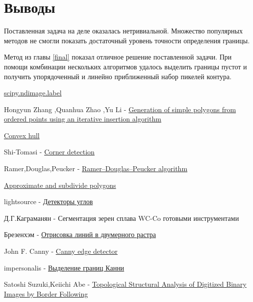 \documentclass[a4paper, 14pt]{article}
\begin{document}
\section{Выводы}

Поставленная задача на деле оказалась нетривиальной. Множество популярных методов не смогли показать достаточный уровень точности определения границы. 

Метод из главы \ref{final} показал отличное решение поставленной задачи. При помощи комбинации нескольких алгоритмов удалось выделить границы пустот и получить упорядоченный и линейно приближенный набор пикелей контура.  

\newpage
\begin{thebibliography}{}
	
	
	   \href{https://docs.scipy.org/doc/scipy/reference/generated/scipy.ndimage.label.html}{scipy.ndimage.label}
	
	  Hongyun Zhang ,Quanhua Zhao  ,Yu Li   -  \href{https://journals.plos.org/plosone/article?id=10.1371/journal.pone.0230342}{Generation of simple polygons from ordered points using an iterative insertion algorithm}
	
	    \href{https://en.wikipedia.org/wiki/Convex_hull}{Convex hull}

	  Shi-Tomasi   -  \href{https://en.wikipedia.org/wiki/Corner_detection}{Corner detection}
	
	 Ramer,Douglas,Peucker  - \href{https://habr.com/ru/post/448618/}{Ramer–Douglas–Peucker algorithm}
	
	  \href{https://scikit-image.org/docs/dev/auto_examples/edges/plot_polygon.html#sphx-glr-download-auto-examples-edges-plot-polygon-py} {Approximate and subdivide polygons}
	
	 lightsource
	 -  \href{	https://habr.com/ru/post/244541/} {Детекторы углов}
	

	
	 Д.Г.Каграманян -  Сегментация зерен сплава WC-Co готовыми инструментами
	
	   Брезенхэм   -  \href{https://en.wikipedia.org/wiki/Bresenham%27s_line_algorithm}{Отрисовка линий в двумерного растра}
		
	    John F. Canny    -  \href{https://en.wikipedia.org/wiki/Canny_edge_detector}{Canny edge detector}
		
	   impersonalis   -  \href{https://habr.com/ru/post/114589/}{Выделение границ Канни}
	
	  Satoshi Suzuki,Keiichi Abe   -  \href{https://www.sciencedirect.com/science/article/abs/pii/0734189X85900167}{Topological Structural Analysis of Digitized Binary Images by Border Following}
	

		


\end{thebibliography}
	



	
\end{document}
